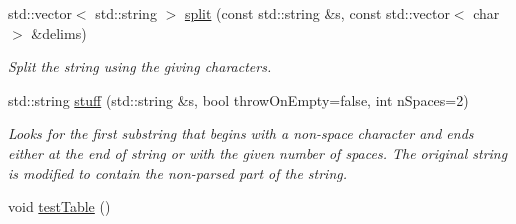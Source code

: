 \begin{DoxyCompactItemize}
std\+::vector$<$ std\+::string $>$ \hyperlink{namespaceslb_1_1core_1_1util_a0b17f4ccc4a084619d95187d7dad6f65}{split} (const std\+::string \&s, const std\+::vector$<$ char $>$ \&delims)
\begin{DoxyCompactList}\small\item\em Split the string using the giving characters. \end{DoxyCompactList}\item 
std\+::string \hyperlink{namespaceslb_1_1core_1_1util_ad3241e5d4d570f8547a7ce25cf830ed9}{stuff} (std\+::string \&s, bool throw\+On\+Empty=false, int n\+Spaces=2)
\begin{DoxyCompactList}\small\item\em Looks for the first substring that begins with a non-\/space character and ends either at the end of string or with the given number of spaces. The original string is modified to contain the non-\/parsed part of the string. \end{DoxyCompactList}\item 
void \hyperlink{namespaceslb_1_1core_1_1util_a4a58db5cca1c87149055968926cd0cd6}{test\+Table} ()\hypertarget{namespaceslb_1_1core_1_1util_a4a58db5cca1c87149055968926cd0cd6}{}\label{namespaceslb_1_1core_1_1util_a4a58db5cca1c87149055968926cd0cd6}


\end{DoxyCompactItemize}
